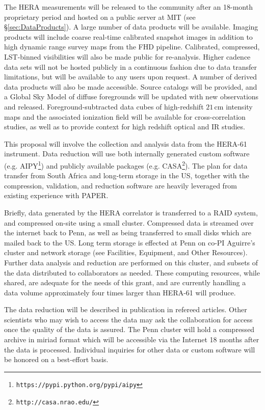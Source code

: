 \documentclass[preprint]{aastex}
\begin{document}
\parskip 0.25in

The HERA measurements will be released to the community after an 18-month proprietary period and hosted on a public server at MIT (see \S\ref{sec:DataProducts}).  A large number of data products will be available.  Imaging products will include coarse real-time calibrated snapshot images in addition to high dynamic range survey maps from the FHD pipeline.  Calibrated, compressed, LST-binned visibilities will also be made public for re-analysis.  Higher cadence data sets will not be hosted publicly in a continuous fashion due to data transfer limitations, but will be available to any users upon request.  A number of derived data products will also be made accessible.  Source catalogs will be provided, and a Global Sky Model of diffuse foregrounds will be updated with new observations and released.  Foreground-subtracted data cubes of high-redshift $21\,\textrm{cm}$ intensity maps and the associated ionization field will be available for cross-correlation studies, as well as to provide context for high redshift optical and IR studies.


This proposal will involve the collection and analysis data from the HERA-61 instrument.
Data reduction will use both internally generated custom software (e.g. AIPY\footnote{\tt https://pypi.python.org/pypi/aipy}) and publicly available packages (e.g. CASA\footnote{ \tt http://casa.nrao.edu/}).  The plan for data transfer from South Africa and long-term storage in the US, together with the compression, validation, and reduction software are heavily leveraged from existing experience with PAPER. \parskip 0pt

Briefly, data generated by the HERA correlator is transferred to a RAID system, and compressed on-site using a small cluster.  Compressed data is streamed over the internet back to Penn, as well as being transferred to small disks which are mailed back to the US.  Long term storage is effected at Penn on co-PI Aguirre's cluster and network storage (see Facilities, Equipment, and Other Resources).  Further data analysis and reduction are performed on this cluster, and subsets of the data distributed to collaborators as needed.  These computing resources, while shared, are adequate for the needs of this grant, and are currently handling a data volume approximately four times larger than HERA-61 will produce.  

The data reduction will be described in publication in refereed articles.  Other
scientists who may wish to access the data may ask the collaboration for access once the quality of the data is assured.  The Penn cluster will hold a compressed archive in {\sc miriad} format which will be accessible via the Internet 18 months after the data is processed. Individual inquiries for other data or custom software will be honored on a best-effort basis. 
\end{document}
